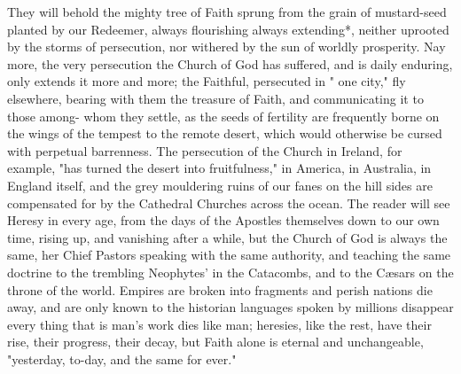 \documentclass[12pt]{book}
\begin{document}
They will behold the mighty tree of Faith sprung from the grain of mustard-seed planted by our
Redeemer, always flourishing always extending*, neither uprooted by the storms of persecution, nor
withered by the sun of worldly prosperity. Nay more, the very persecution the Church of God has
suffered, and is daily enduring, only extends it more and more; the Faithful, persecuted in " one city," fly
elsewhere, bearing with them the treasure of Faith, and communicating it to those among- whom they
settle, as the seeds of fertility are frequently borne on the wings of the tempest to the remote desert,
which would otherwise be cursed with perpetual barrenness. The persecution of the Church in Ireland,
for example, "has turned the desert into fruitfulness," in America, in Australia, in England itself, and the
grey mouldering ruins of our fanes on the hill sides are compensated for by the Cathedral Churches
across the ocean. The reader will see Heresy in every age, from the days of the Apostles themselves down
to our own time, rising up, and vanishing after a while, but the Church of God is always the same, her
Chief Pastors speaking with the same authority, and teaching the same doctrine to the trembling
Neophytes’ in the Catacombs, and to the C{\ae}sars on the throne of the world. Empires are broken into
fragments and perish nations die away, and are only known to the historian languages spoken by
millions disappear every thing that is man’s work dies like man; heresies, like the rest, have their rise,
their progress, their decay, but Faith alone is eternal and unchangeable, "yesterday, to-day, and the same
for ever."
\end{document}
